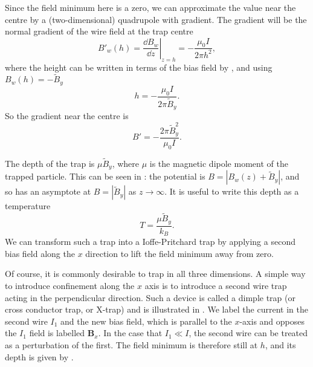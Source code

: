 Since the field minimum here is a zero, we can approximate the value near the
centre by a (two-dimensional) quadrupole with gradient. The gradient will be
the normal gradient of the wire field at the trap centre
%
\begin{equation}
  B'_w(h) = \left.\frac{\dd B_w}{\dd z}\right|_{z=h} = - \frac{\mu_0 I}{2\pi
      h^2},
\end{equation}
%
where the height can be written in terms of the bias field by
, and using $B_w(h) = -\tilde{B}_y$
%
\begin{equation}
  h = -\frac{\mu_0 I}{2\pi \tilde{B}_y}.
  \label{theory:eqn:height}
\end{equation}
%
So the gradient near the centre is
%
\begin{equation}
  B' = -\frac{2\pi \tilde{B}_y^2}{\mu_0 I}.
\end{equation}

The depth of the trap is $\mu \tilde{B}_y$, where $\mu$ is the magnetic dipole
moment of the trapped particle. This can be seen in
: the potential is $B = |B_w(z) +
\tilde{B}_y|$, and so has an asymptote at $B=|\tilde{B}_y|$ as
$z\rightarrow\infty$. It is useful to write this depth as a temperature
%
\begin{equation}
  T  = \frac{\mu \tilde{B}_y}{k_B}.
  \label{theory:eqn:depth}
\end{equation}
%
We can transform such a trap into a Ioffe-Pritchard trap by applying a second
bias field along the $x$ direction to lift the field minimum away from
zero.

Of course, it is commonly desirable to trap in all three dimensions. A simple
way to introduce confinement along the $x$ axis is to introduce a second wire
trap acting in the perpendicular direction. Such a device is called a dimple
trap (or cross conductor trap, or X-trap) and is illustrated in
. We label the current in the second wire $I_1$
and the new bias field, which is parallel to the $x$-axis and opposes the
$I_1$ field is labelled $\mathbf{B}_x$. In the case that $I_1 \ll I$, the
second wire can be treated as a perturbation of the first. The field minimum is
therefore still at $h$, and its depth is given by .

